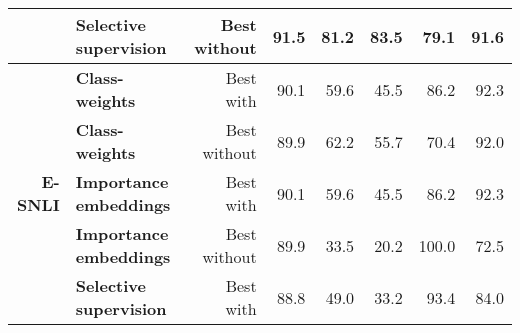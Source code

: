 \begin{table*}[]
\begin{tabular}{@{}rlrrrrrr@{}}
                                                      & \textbf{Selective supervision}   & Best without                                       & 91.5                                                   & 81.2                            & 83.5                                   & 79.1                                & 91.6                                                                                                      \\ \midrule
\multirow{6}{*}{\textbf{E-SNLI}}                      & \textbf{Class-weights}           & Best with                                          & 90.1                                                   & 59.6                            & 45.5                                   & 86.2                                & 92.3                                                                                                      \\
                                                      & \textbf{Class-weights}           & Best without                                       & 89.9                                                   & 62.2                            & 55.7                                   & 70.4                                & 92.0                                                                                                      \\ \cmidrule(l){2-8} 
                                                      & \textbf{Importance embeddings}   & Best with                                          & 90.1                                                   & 59.6                            & 45.5                                   & 86.2                                & 92.3                                                                                                      \\
                                                      & \textbf{Importance embeddings}   & Best without                                       & 89.9                                                   & 33.5                            & 20.2                                   & 100.0                               & 72.5                                                                                                      \\ \cmidrule(l){2-8} 
                                                      & \textbf{Selective supervision}   & Best with                                          & 88.8                                                   & 49.0                            & 33.2                                   & 93.4                                & 84.0                                                                                                      \\

\end{tabular}
\end{table*}
